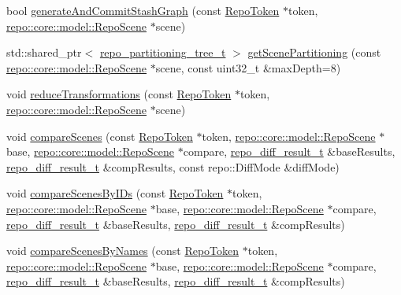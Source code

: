 \begin{DoxyCompactItemize}
\item 
bool \hyperlink{class_repo_controller_1_1___repo_controller_impl_ad24bb05af8bc5288dbf5516f0438d9f3}{generate\+And\+Commit\+Stash\+Graph} (const \hyperlink{class_repo_controller_1_1_repo_token}{Repo\+Token} $\ast$token, \hyperlink{classrepo_1_1core_1_1model_1_1_repo_scene}{repo\+::core\+::model\+::\+Repo\+Scene} $\ast$scene)
\item 
std\+::shared\+\_\+ptr$<$ \hyperlink{structrepo__partitioning__tree__t}{repo\+\_\+partitioning\+\_\+tree\+\_\+t} $>$ \hyperlink{class_repo_controller_1_1___repo_controller_impl_a62aeadf5f695550429bb65403be5e6db}{get\+Scene\+Partitioning} (const \hyperlink{classrepo_1_1core_1_1model_1_1_repo_scene}{repo\+::core\+::model\+::\+Repo\+Scene} $\ast$scene, const uint32\+\_\+t \&max\+Depth=8)
\item 
void \hyperlink{class_repo_controller_1_1___repo_controller_impl_a12a402fb6e881616d0a10ee1d291d960}{reduce\+Transformations} (const \hyperlink{class_repo_controller_1_1_repo_token}{Repo\+Token} $\ast$token, \hyperlink{classrepo_1_1core_1_1model_1_1_repo_scene}{repo\+::core\+::model\+::\+Repo\+Scene} $\ast$scene)
\item 
void \hyperlink{class_repo_controller_1_1___repo_controller_impl_af212f934dcb88fbfdd3756aa203f386c}{compare\+Scenes} (const \hyperlink{class_repo_controller_1_1_repo_token}{Repo\+Token} $\ast$token, \hyperlink{classrepo_1_1core_1_1model_1_1_repo_scene}{repo\+::core\+::model\+::\+Repo\+Scene} $\ast$base, \hyperlink{classrepo_1_1core_1_1model_1_1_repo_scene}{repo\+::core\+::model\+::\+Repo\+Scene} $\ast$compare, \hyperlink{structrepo__diff__result__t}{repo\+\_\+diff\+\_\+result\+\_\+t} \&base\+Results, \hyperlink{structrepo__diff__result__t}{repo\+\_\+diff\+\_\+result\+\_\+t} \&comp\+Results, const repo\+::\+Diff\+Mode \&diff\+Mode)
\item 
void \hyperlink{class_repo_controller_1_1___repo_controller_impl_a81f8dd6e1730e1ed8514658bbe0da82d}{compare\+Scenes\+By\+I\+Ds} (const \hyperlink{class_repo_controller_1_1_repo_token}{Repo\+Token} $\ast$token, \hyperlink{classrepo_1_1core_1_1model_1_1_repo_scene}{repo\+::core\+::model\+::\+Repo\+Scene} $\ast$base, \hyperlink{classrepo_1_1core_1_1model_1_1_repo_scene}{repo\+::core\+::model\+::\+Repo\+Scene} $\ast$compare, \hyperlink{structrepo__diff__result__t}{repo\+\_\+diff\+\_\+result\+\_\+t} \&base\+Results, \hyperlink{structrepo__diff__result__t}{repo\+\_\+diff\+\_\+result\+\_\+t} \&comp\+Results)
\item 
void \hyperlink{class_repo_controller_1_1___repo_controller_impl_ae94cea6a945be6a2ad0d340cd70aa58e}{compare\+Scenes\+By\+Names} (const \hyperlink{class_repo_controller_1_1_repo_token}{Repo\+Token} $\ast$token, \hyperlink{classrepo_1_1core_1_1model_1_1_repo_scene}{repo\+::core\+::model\+::\+Repo\+Scene} $\ast$base, \hyperlink{classrepo_1_1core_1_1model_1_1_repo_scene}{repo\+::core\+::model\+::\+Repo\+Scene} $\ast$compare, \hyperlink{structrepo__diff__result__t}{repo\+\_\+diff\+\_\+result\+\_\+t} \&base\+Results, \hyperlink{structrepo__diff__result__t}{repo\+\_\+diff\+\_\+result\+\_\+t} \&comp\+Results)

\end{DoxyCompactItemize}
